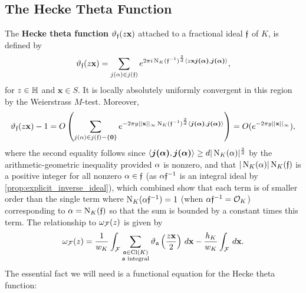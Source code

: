    \subsection*{The Hecke Theta Function}
      The \textbf{Hecke theta function} $\vartheta_{\mathfrak{f}}(z\mathbf{x})$ attached to a fractional ideal $\mathfrak{f}$ of $K$, is defined by
      \[
        \vartheta_{\mathfrak{f}}(z\mathbf{x}) = \sum_{j(\alpha) \in j(\mathfrak{f})}e^{2\pi i\operatorname{\mathrm{N}}_{K}(\mathfrak{f}^{-1})^{\frac{2}{d}}\langle z\mathbf{x}\boldsymbol{j(\alpha)},\boldsymbol{j(\alpha)}\rangle},
      \]
      for $z \in \mathbb{H}$ and $\mathbf{x} \in S$. It is locally absolutely uniformly convergent in this region by the Weierstrass $M$-test. Moreover,
      \[
        \vartheta_{\mathfrak{f}}(z\mathbf{x})-1 = O\left(\sum_{j(\alpha) \in j(\mathfrak{f})-\{\mathbf{0}\}}e^{-2\pi y||\mathbf{x}||_{\infty}\operatorname{\mathrm{N}}_{K}(\mathfrak{f}^{-1})^{\frac{2}{d}}\langle\boldsymbol{j(\alpha)},\boldsymbol{j(\alpha)}\rangle}\right) = O(e^{-2\pi y||\mathbf{x}||_{\infty}}),
      \]
      where the second equality follows since $\langle\boldsymbol{j(\alpha)},\boldsymbol{j(\alpha)}\rangle \ge d|\operatorname{\mathrm{N}}_{K}(\alpha)|^{\frac{2}{d}}$ by the arithmetic-geometric inequality provided $\alpha$ is nonzero, and that $|\operatorname{\mathrm{N}}_{K}(\alpha)|\operatorname{\mathrm{N}}_{K}(\mathfrak{f})$ is a positive integer for all nonzero $\alpha \in \mathfrak{f}$ (as $\alpha\mathfrak{f}^{-1}$ is an integral ideal by \cref{prop:explicit_inverse_ideal}), which combined show that each term is of smaller order than the single term where $\operatorname{\mathrm{N}}_{K}(\alpha\mathfrak{f}^{-1}) = 1$ (when $\alpha\mathfrak{f}^{-1} = \mathcal{O}_{K}$) corresponding to $\alpha = \operatorname{\mathrm{N}}_{K}(\mathfrak{f})$ so that the sum is bounded by a constant times this term. The relationship to $\omega_{\mathcal{F}}(z)$ is given by
      \[
        \omega_{\mathcal{F}}(z) = \frac{1}{w_{K}}\int_{\mathcal{F}}\sum_{\substack{\mathfrak{a} \in \operatorname{\mathrm{Cl}}(K) \\ \text{$\mathfrak{a}$ integral}}}\vartheta_{\mathfrak{a}}\left(\frac{z\mathbf{x}}{2}\right)\,d\mathbf{x}-\frac{h_{K}}{w_{K}}\int_{\mathcal{F}}\,d\mathbf{x}.
      \]
      The essential fact we will need is a functional equation for the Hecke theta function:


